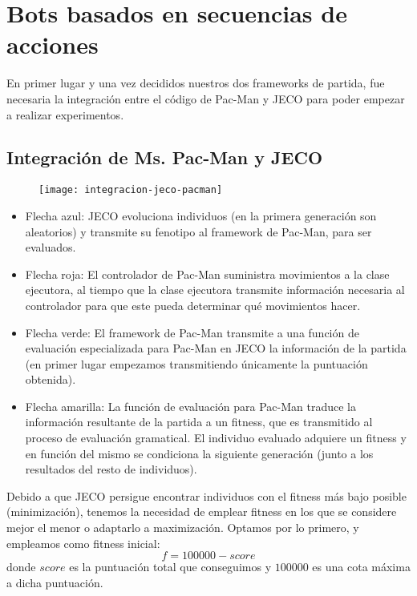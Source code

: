 \chapter{Bots basados en secuencias de acciones}
En primer lugar y una vez decididos nuestros dos frameworks de partida, fue necesaria la integración entre el código de Pac-Man y JECO para poder empezar a realizar experimentos.

\section{Integración de Ms. Pac-Man y JECO}
\begin{figure}[H]
\centering
\texttt{[image: integracion-jeco-pacman]}
\end{figure}
\begin{itemize}
\item Flecha azul: JECO evoluciona individuos (en la primera generación son aleatorios) y transmite su fenotipo al framework de Pac-Man, para ser evaluados.

\item Flecha roja: El controlador de Pac-Man suministra movimientos a la clase ejecutora, al tiempo que la clase ejecutora transmite información necesaria al controlador para que este pueda determinar qué movimientos hacer.

\item Flecha verde: El framework de Pac-Man transmite a una función de evaluación especializada para Pac-Man en JECO la información de la partida (en primer lugar empezamos transmitiendo únicamente la puntuación obtenida).

\item Flecha amarilla: La función de evaluación para Pac-Man traduce la información resultante de la partida a un fitness, que es transmitido al proceso de evaluación gramatical. El individuo evaluado adquiere un fitness y en función del mismo se condiciona la siguiente generación (junto a los resultados del resto de individuos).
\end{itemize}

Debido a que JECO persigue encontrar individuos con el fitness más bajo posible (minimización), tenemos la necesidad de emplear fitness en los que se considere mejor el menor o adaptarlo a maximización. Optamos por lo primero, y empleamos como fitness inicial:
\begin{equation}
f = 100000 - score
\end{equation}
donde $score$ es la puntuación total que conseguimos y $100000$ es una cota máxima a dicha puntuación.



